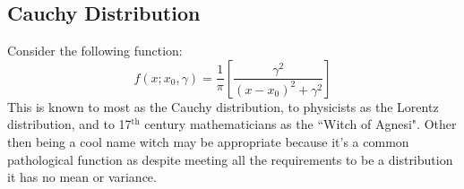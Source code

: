 
\subsection{Cauchy Distribution}
Consider the following function:
\[f(x;x_0,\gamma) = \frac{1}{\pi}\left[\frac{\gamma^2}{(x-x_0)^2+\gamma^2}\right]\]
This is known to most as the Cauchy distribution, to physicists as the Lorentz distribution, and to 17$^{\text{th}}$ century mathematicians as the ``Witch of Agnesi".
Other then being a cool name witch may be appropriate because it's a common pathological function as despite meeting all the requirements to be a distribution it has no mean or variance. 

